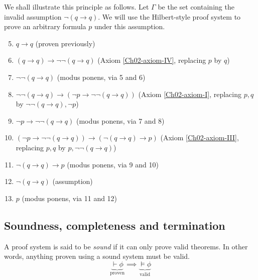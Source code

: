 We shall illustrate this principle as follows. Let \(\Gamma\) be the set containing the invalid assumption \(\neg(q \rightarrow q)\). We will use the Hilbert-style proof system to prove an arbitrary formula \(p\) under this assumption.
%
\begin{enumerate}
    \setcounter{enumi}{4}
    \item \(q \rightarrow q\)
    \hfill (proven previously)

    \item \((q \rightarrow q) \rightarrow \neg\neg(q \rightarrow q)\)
    \hfill (Axiom \ref{Ch02-axiom-IV}, replacing \(p\) by \(q\))

    \item \(\neg\neg(q \rightarrow q)\)
    \hfill (modus ponens, via 5 and 6)

    \item \(\neg\neg(q \rightarrow q) \rightarrow (\neg p \rightarrow \neg\neg(q \rightarrow q))\)
    \hfill (Axiom \ref{Ch02-axiom-I}, replacing \(p, q\) by \(\neg\neg(q \rightarrow q), \neg p\))

    \item \(\neg p \rightarrow \neg\neg(q \rightarrow q)\)
    \hfill (modus ponens, via 7 and 8)

    \item \((\neg p \rightarrow \neg\neg(q \rightarrow q)) \rightarrow (\neg (q \rightarrow q) \rightarrow p)\)
    \hfill (Axiom \ref{Ch02-axiom-III}, replacing \(p, q\) by \(p, \neg\neg(q \rightarrow q)\))

    \item \(\neg (q \rightarrow q) \rightarrow p\)
    \hfill (modus ponens, via 9 and 10)

    \item \(\neg (q \rightarrow q)\)
    \hfill (assumption)

    \item \(p\)
    \hfill (modus ponens, via 11 and 12)
\end{enumerate}



\subsection{Soundness, completeness and termination}

A proof system is said to be \emph{sound} if it can only prove valid theorems. In other words, anything proven using a sound system must be valid.
%
\begin{equation}
    \underbrace{\vdash \phi}_{\text{proven}} \implies \underbrace{\models \phi}_{\text{valid}} \tag{soundness}
\end{equation}

